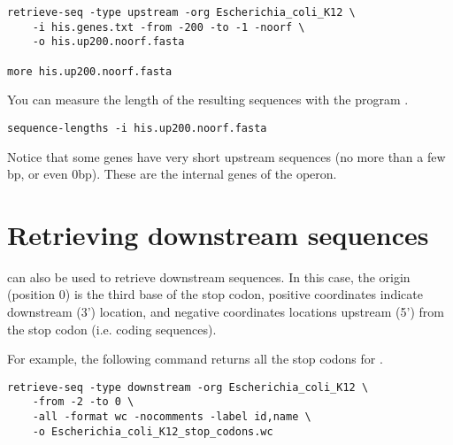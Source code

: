 {\color{blue} \begin{footnotesize}
\begin{verbatim}
retrieve-seq -type upstream -org Escherichia_coli_K12 \
    -i his.genes.txt -from -200 -to -1 -noorf \
    -o his.up200.noorf.fasta

more his.up200.noorf.fasta
\end{verbatim} \end{footnotesize}
}

You can measure the length of the resulting sequences with the program
.

{\color{blue} \begin{footnotesize}
\begin{verbatim}
sequence-lengths -i his.up200.noorf.fasta
\end{verbatim} \end{footnotesize}
}

Notice that some genes have very short upstream sequences (no more
than a few bp, or even 0bp). These are the internal genes of the
\gene{his} operon. 

\section{Retrieving downstream sequences}

 can also be used to retrieve downstream
sequences. In this case, the origin (position 0) is the third base of
the stop codon, positive coordinates indicate downstream (3')
location, and negative coordinates locations upstream (5') from the
stop codon (i.e. coding sequences). 

For example, the following command returns all the stop codons for
.

{\color{blue} \begin{footnotesize}
\begin{verbatim}
retrieve-seq -type downstream -org Escherichia_coli_K12 \
    -from -2 -to 0 \
    -all -format wc -nocomments -label id,name \
    -o Escherichia_coli_K12_stop_codons.wc
\end{verbatim} \end{footnotesize}
}


